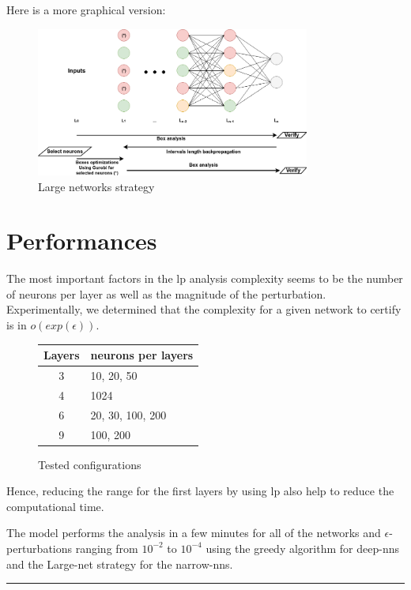 \documentclass[8pt,a4paper]{article}
\begin{document}
Here is a more graphical version:

\begin{figure}[H]
\begin{center}
\includegraphics[width=9cm]{NN_lastlayer.png}
\caption{Large networks strategy}
\end{center}
\end{figure}

\section{Performances}

The most important factors in the \gls{lp} analysis complexity seems to be the number of neurons per layer as well as the magnitude of the perturbation. Experimentally, we determined that the complexity for a given network to certify is in $o(exp(\epsilon))$. 
\begin{figure}
	\vspace{-30pt}
	\begin{center}
		\small
		\begin{tabular}{| c || l | }
			Layers & neurons per layers \\
			\hline
			3 & 10, 20, 50 \\
			4 & 1024 \\
			6 & 20, 30, 100, 200 \\
			9 & 100, 200 \\
		\end{tabular}
	\end{center}
	\vspace{-11pt}
	\caption{Tested configurations}
	\vspace{-10pt}
\end{figure}
Hence, reducing the range for the first layers by using \gls{lp} also help to reduce the computational time.

The model performs the analysis in a few minutes for all of the networks and $\epsilon$-perturbations ranging from $10^{-2}$ to $10^{-4}$ using the greedy algorithm for deep-\gls{nn}s and the Large-net strategy for the narrow-\gls{nn}s.

\vfill
\hrule
\end{document}
